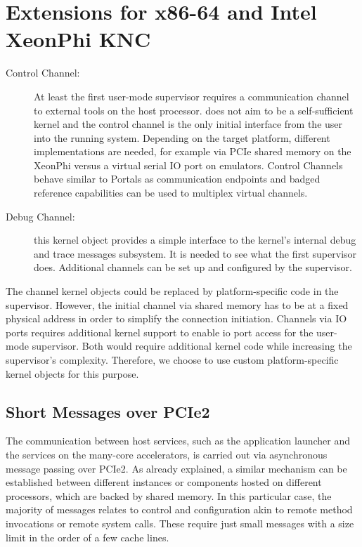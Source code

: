 \chapter{Extensions for x86-64 and Intel XeonPhi KNC}

\begin{description}
\item[Control Channel:]
At least the first user-mode supervisor requires a communication channel to external tools on the host processor. \mythos does not aim to be a self-sufficient kernel and the control channel is the only initial interface from the user into the running system. Depending on the target platform, different implementations are needed, for example via PCIe shared memory on the XeonPhi versus a virtual serial IO port on emulators. Control Channels behave similar to Portals as communication endpoints and badged reference capabilities can be used to multiplex virtual channels. 
\item[Debug Channel:] this kernel object provides a simple interface to the kernel's internal debug and trace messages subsystem. It is needed to see what the first supervisor does. Additional channels can be set up and configured by the supervisor.
\end{description}

The channel kernel objects could be replaced by platform-specific code in the supervisor. However, the initial channel via shared memory has to be at a fixed physical address in order to simplify the connection initiation. Channels via IO ports requires additional kernel support to enable io port access for the user-mode supervisor. Both would require additional kernel code while increasing the supervisor's complexity. Therefore, we choose to use custom platform-specific kernel objects for this purpose.


\section{Short Messages over PCIe2}
\label{sec:short-message-channel-pci}

The communication between host services, such as the application launcher and
the \mythos services on the many-core accelerators, is carried out via
asynchronous message passing over PCIe2. As already explained, a similar
mechanism can be established between different \mythos instances or components
hosted on different processors, which are backed by shared memory. In this
particular case, the majority of messages relates to control and configuration
akin to remote method invocations or remote system calls. These require just
small messages with a size limit in the order of a few cache lines.

